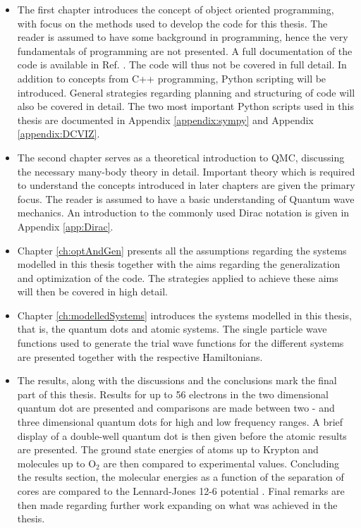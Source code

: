 \begin{itemize}
 \item The first chapter introduces the concept of object oriented programming, with focus on the methods used to develop the code for this thesis. The reader is assumed to have some background in programming, hence the very fundamentals of programming are not presented. A full documentation of the code is available in Ref. \cite{libBorealisCode}. The code will thus not be covered in full detail. In addition to concepts from C++ programming, Python scripting will be introduced. General strategies regarding planning and structuring of code will also be covered in detail. The two most important Python scripts used in this thesis are documented in Appendix \ref{appendix:sympy} and Appendix \ref{appendix:DCVIZ}.
 
 \item The second chapter serves as a theoretical introduction to QMC, discussing the necessary many-body theory in detail. Important theory which is required to understand the concepts introduced in later chapters are given the primary focus. The reader is assumed to have a basic understanding of Quantum wave mechanics. An introduction to the commonly used Dirac notation is given in Appendix \ref{app:Dirac}.
 
 \item Chapter \ref{ch:optAndGen} presents all the assumptions regarding the systems modelled in this thesis together with the aims regarding the generalization and optimization of the code. The strategies applied to achieve these aims will then be covered in high detail.
 
 \item Chapter \ref{ch:modelledSystems} introduces the systems modelled in this thesis, that is, the quantum dots and atomic systems. The single particle wave functions used to generate the trial wave functions for the different systems are presented together with the respective Hamiltonians.
 
 \item The results, along with the discussions and the conclusions mark the final part of this thesis. Results for up to 56 electrons in the two dimensional quantum dot are presented and comparisons are made between two - and three dimensional quantum dots for high and low frequency ranges. A brief display of a double-well quantum dot is then given before the atomic results are presented. The ground state energies of atoms up to Krypton and molecules up to $\mathrm{O_2}$ are then compared to experimental values. Concluding the results section, the molecular energies as a function of the separation of cores are compared to the Lennard-Jones 12-6 potential \cite{MD1, MD2}. Final remarks are then made regarding further work expanding on what was achieved in the thesis. 
\end{itemize}